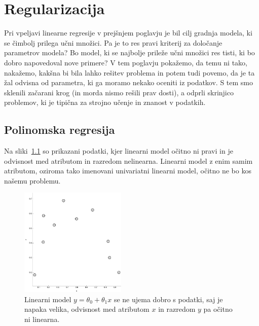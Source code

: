 \chapter{Regularizacija}

Pri vpeljavi linearne regresije v prejšnjem poglavju je bil cilj
gradnja modela, ki se čimbolj prilega učni množici. Pa je to res pravi
kriterij za določanje parametrov modela? Bo model, ki se najbolje
prileže učni množici res tisti, ki bo dobro napovedoval nove primere?
V tem poglavju pokažemo, da temu ni tako, nakažemo, kakšna bi bila
lahko rešitev problema in potem tudi povemo, da je ta žal odvisna od
parametra, ki ga moramo nekako oceniti iz podatkov. S tem smo sklenili
začarani krog (in morda nismo rešili prav dosti), a odprli skrinjico
problemov, ki je tipična za strojno učenje in znanost v podatkih.

\section{Polinomska regresija}

Na sliki~\ref{fig:poly-linear} so prikazani podatki, kjer linearni model očitno ni pravi in je odvisnost med atributom in razredom nelinearna. Linearni model z enim samim atributom, oziroma tako imenovani univariatni linearni model, očitno ne bo kos našemu problemu. 

\begin{figure}[htbp]
\begin{center}
\includegraphics[width=0.45\textwidth]{slike/poly-linear.png}
\caption{Linearni model $y=\theta_0 + \theta_1 x$ se ne ujema dobro s podatki, saj je napaka velika, odvisnost med atributom $x$ in razredom $y$ pa očitno ni linearna.}
\label{fig:poly-linear}
\end{center}
\end{figure}

